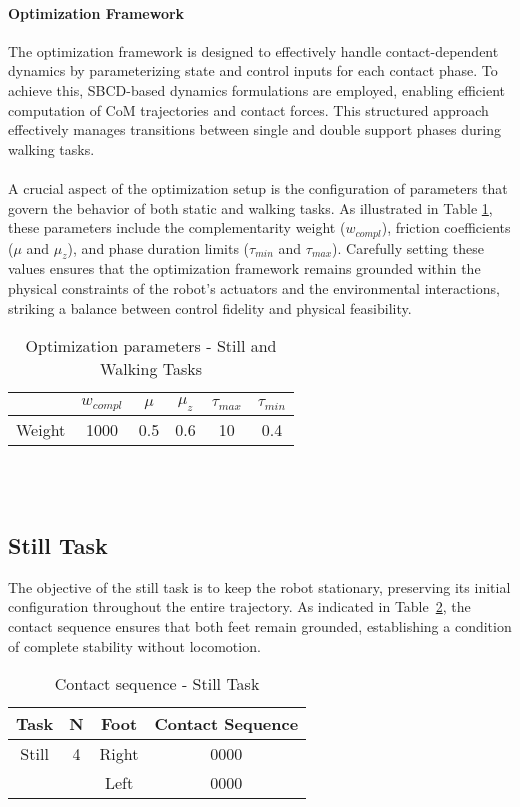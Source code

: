 \documentclass[main.tex]{subfiles}
\begin{document}
\begin{sloppypar}
\paragraph{Optimization Framework} The optimization framework is designed to effectively handle contact-dependent dynamics by parameterizing state and control inputs for each contact phase. To achieve this, SBCD-based dynamics formulations are employed, enabling efficient computation of CoM trajectories and contact forces. This structured approach effectively manages transitions between single and double support phases during walking tasks.\\
\\
A crucial aspect of the optimization setup is the configuration of parameters that govern the behavior of both static and walking tasks. As illustrated in Table \ref{tab:optimization_params}, these parameters include the complementarity weight ($w_{compl}$), friction coefficients ($\mu$ and $\mu_z$), and phase duration limits ($\tau_{min}$ and $\tau_{max}$). Carefully setting these values ensures that the optimization framework remains grounded within the physical constraints of the robot’s actuators and the environmental interactions, striking a balance between control fidelity and physical feasibility.
\begin{table}[h!]
    \centering
    \begin{tabular}{lccccc}
        \toprule
        & $w_{compl}$ & $\mu$ & $\mu_z$ & $\tau_{max}$ & $\tau_{min}$ \\
        \midrule 
        Weight & 1000 & 0.5 & 0.6 & 10 & 0.4 \\
        \bottomrule
    \end{tabular}
    \caption{Optimization parameters - Still and Walking Tasks}
    \label{tab:optimization_params}
\end{table}
\\
\\
\subsection{Still Task}  
The objective of the still task is to keep the robot stationary, preserving its initial configuration throughout the entire trajectory. As indicated in Table~\ref{tab:stilltask}, the contact sequence ensures that both feet remain grounded, establishing a condition of complete stability without locomotion.
\begin{table}[h!]
    \centering
    \begin{tabular}{|c|c|c|c|}
    \hline
    Task & N & Foot & Contact Sequence \\
    \hline
    Still & 4 & Right & 0000 \\
    & & Left & 0000 \\
    \hline
    \end{tabular}
    \caption{Contact sequence - Still Task}
    \label{tab:stilltask}
\end{table}

\end{sloppypar}
\end{document}
